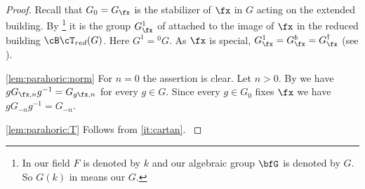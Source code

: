 \documentclass[12pt,a4paper]{amsart}%
\newcommand{\RamiA}[1]{{{#1}}}
\newcommand{\claude}[1]{{{#1}}}
\newcommand{\claudeA}[1]{{{#1}}}
\newcommand{\RamiF}[1]{{{#1}}}
\begin{document}
\begin{proof}
\claude{Recall that $G_0=G_\fx$ is the stabilizer of $\fx$ in $G$ acting on the extended building. By \cite[Lemma 4.3.3]{KP}\footnote{\RamiF{In \cite{KP} our field $F$ is denoted by $k$ and our algebraic group $\bfG$ is denoted by $G$. So $G(k)$ in \cite{KP} means our $G$.}} it is the group $\RamiF{G}^1_\fx$ of \cite[(7.7.1)]{KP} attached to the image of $\fx$ in \claudeA{the reduced building $\cB\cT_{red}(G)$}.  \RamiF{Here} $\RamiF{G}^1={}^0G$. As $\fx$ is special, $\RamiF{G}^1_\fx=\RamiF{G}^b_\fx=\RamiF{G}^\dagger_\fx$} (\RamiA{see \cite[Lemma 4.3.3, Proposition~7.7.11]{KP}}).

\claude{\eqref{lem:parahoric:norm} For $n=0$ the assertion \RamiF{is clear}. Let $n>0$. By \cite[Proposition~13.2.5(2)]{KP} we have $gG_{\fx,n}g^{-1}=G_{g\fx,n}$ for every $g\in G$. \RamiF{Since} every $g\in G_0$ fixes $\fx$ \RamiF{we have} $gG_{-n}g^{-1}=G_{-n}$.}

\claude{\eqref{lem:parahoric:T} 
\RamiF{Follows from \Cref{not:settings}\eqref{it:cartan}}.
}


\end{proof}
\end{document}
